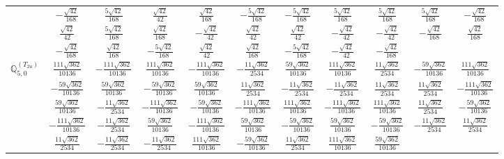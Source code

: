 \documentclass[fleqn,10pt,landscape]{article}
\begin{document}
\begin{itemize}
{\begin{center}
\begin{longtable}{ccccccccccc}
& $ - \frac{\sqrt{42}}{168} $ & $ \frac{5 \sqrt{42}}{168} $ & $ \frac{\sqrt{42}}{42} $ & $ \frac{\sqrt{42}}{168} $ & $ - \frac{5 \sqrt{42}}{168} $ & $ - \frac{5 \sqrt{42}}{168} $ & $ \frac{5 \sqrt{42}}{168} $ & $ \frac{5 \sqrt{42}}{168} $ & $ \frac{5 \sqrt{42}}{168} $ & $ - \frac{\sqrt{42}}{168} $ \\
& $ \frac{\sqrt{42}}{42} $ & $ \frac{5 \sqrt{42}}{168} $ & $ \frac{\sqrt{42}}{168} $ & $ - \frac{\sqrt{42}}{42} $ & $ \frac{\sqrt{42}}{42} $ & $ \frac{\sqrt{42}}{42} $ & $ - \frac{\sqrt{42}}{42} $ & $ - \frac{\sqrt{42}}{42} $ & $ - \frac{\sqrt{42}}{168} $ & $ \frac{\sqrt{42}}{168} $ \\
& $ - \frac{\sqrt{42}}{168} $ & $ \frac{\sqrt{42}}{168} $ & $ - \frac{5 \sqrt{42}}{168} $ & $ \frac{\sqrt{42}}{42} $ & $ \frac{\sqrt{42}}{168} $ & $ - \frac{5 \sqrt{42}}{168} $ & $ - \frac{\sqrt{42}}{42} $ & $ - \frac{\sqrt{42}}{168} $ & $  $ & $  $ \\ \hline
$\mathbb{Q}_{5,0}^{(T_{2u})}$ & $ \frac{111 \sqrt{362}}{10136} $ & $ - \frac{111 \sqrt{362}}{10136} $ & $ \frac{111 \sqrt{362}}{10136} $ & $ - \frac{111 \sqrt{362}}{10136} $ & $ - \frac{11 \sqrt{362}}{2534} $ & $ \frac{59 \sqrt{362}}{10136} $ & $ \frac{111 \sqrt{362}}{10136} $ & $ \frac{11 \sqrt{362}}{2534} $ & $ - \frac{59 \sqrt{362}}{10136} $ & $ \frac{111 \sqrt{362}}{10136} $ \\
& $ - \frac{59 \sqrt{362}}{10136} $ & $ \frac{59 \sqrt{362}}{10136} $ & $ - \frac{59 \sqrt{362}}{10136} $ & $ \frac{59 \sqrt{362}}{10136} $ & $ \frac{11 \sqrt{362}}{2534} $ & $ - \frac{11 \sqrt{362}}{2534} $ & $ - \frac{11 \sqrt{362}}{2534} $ & $ \frac{11 \sqrt{362}}{2534} $ & $ \frac{11 \sqrt{362}}{2534} $ & $ - \frac{111 \sqrt{362}}{10136} $ \\
& $ \frac{59 \sqrt{362}}{10136} $ & $ - \frac{11 \sqrt{362}}{2534} $ & $ - \frac{111 \sqrt{362}}{10136} $ & $ - \frac{59 \sqrt{362}}{10136} $ & $ - \frac{111 \sqrt{362}}{10136} $ & $ \frac{111 \sqrt{362}}{10136} $ & $ - \frac{111 \sqrt{362}}{10136} $ & $ \frac{111 \sqrt{362}}{10136} $ & $ \frac{11 \sqrt{362}}{2534} $ & $ - \frac{59 \sqrt{362}}{10136} $ \\
& $ - \frac{111 \sqrt{362}}{10136} $ & $ - \frac{11 \sqrt{362}}{2534} $ & $ \frac{59 \sqrt{362}}{10136} $ & $ - \frac{111 \sqrt{362}}{10136} $ & $ \frac{59 \sqrt{362}}{10136} $ & $ - \frac{59 \sqrt{362}}{10136} $ & $ \frac{59 \sqrt{362}}{10136} $ & $ - \frac{59 \sqrt{362}}{10136} $ & $ - \frac{11 \sqrt{362}}{2534} $ & $ \frac{11 \sqrt{362}}{2534} $ \\
& $ \frac{11 \sqrt{362}}{2534} $ & $ - \frac{11 \sqrt{362}}{2534} $ & $ - \frac{11 \sqrt{362}}{2534} $ & $ \frac{111 \sqrt{362}}{10136} $ & $ - \frac{59 \sqrt{362}}{10136} $ & $ \frac{11 \sqrt{362}}{2534} $ & $ \frac{111 \sqrt{362}}{10136} $ & $ \frac{59 \sqrt{362}}{10136} $ & $  $ & $  $ \\ \hline

\end{longtable}
\end{center}}
\end{itemize}
\end{document}
